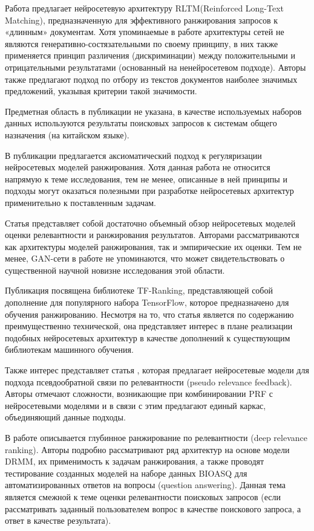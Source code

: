 Работа \cite{DBLP:journals/corr/abs-1906-09404} предлагает нейросетевую архитектуру RLTM(Reinforced Long-Text Matching), предназначенную для эффективного
ранжирования запросов к «длинным» документам. Хотя упоминаемые в работе архитектуры сетей не являются генеративно-состязательными
по своему принципу, в них также применяется принцип различения (дискриминации) между положительными и отрицательными результатами
(основанный на ненейросетевом подходе). Авторы также предлагают подход по отбору из текстов документов наиболее значимых
предложений, указывая критерии такой значимости.

Предметная область в публикации не указана, в качестве используемых наборов данных используются результаты поисковых запросов к
системам общего назначения (на китайском языке).

В публикации \cite{DBLP:journals/corr/abs-1904-06808} предлагается аксиоматический подход к регуляризации нейросетевых моделей
ранжирования. Хотя данная работа не относится напрямую к теме исследования, тем не менее, описанные в ней принципы и подходы
могут оказаться полезными при разработке нейросетевых архитектур применительно к поставленным задачам.

Статья \cite{DBLP:journals/corr/abs-1903-06902} представляет собой достаточно объемный обзор нейросетевых моделей оценки
релевантности и ранжирования результатов. Авторами рассматриваются как архитектуры моделей ранжирования, так и эмпирические
их оценки. Тем не менее, GAN-сети в работе не упоминаются, что может свидетельствовать о существенной научной новизне
исследования этой области.

Публикация \cite{DBLP:journals/corr/abs-1812-00073} посвящена библиотеке TF-Ranking, представляющей собой дополнение для
популярного набора TensorFlow, которое предназначено для обучения ранжированию. Несмотря на то, что статья является
по содержанию преимущественно технической, она представляет интерес в плане реализации подобных нейросетевых архитектур
в качестве дополнений к существующим библиотекам машинного обучения.

Также интерес представляет статья \cite{DBLP:journals/corr/abs-1810-12936}, которая предлагает нейросетевые модели
для подхода псевдообратной связи по релевантности (pseudo relevance feedback). Авторы отмечают сложности, возникающие при
комбинировании PRF с нейросетевыми моделями и в связи с этим предлагают единый каркас, объединяющий данные подходы.

В работе \cite{DBLP:journals/corr/abs-1809-01682} описывается глубинное ранжирование по релевантности (deep relevance ranking).
Авторы подробно рассматривают ряд архитектур на основе модели DRMM, их применимость к задачам ранжирования, а также проводят
тестирование созданных моделей на наборе данных BIOASQ для автоматизированных ответов на вопросы (question answering).
Данная тема является смежной к теме оценки релевантности поисковых запросов (если рассматривать заданный пользователем
вопрос в качестве поискового запроса, а ответ в качестве результата).

